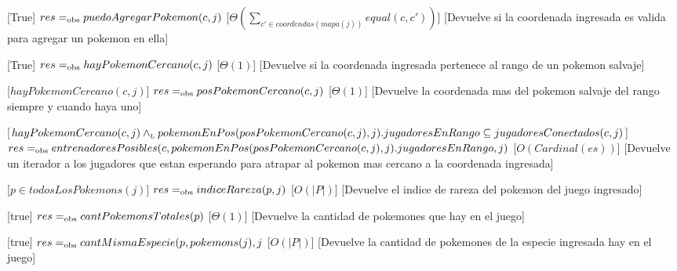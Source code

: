 \begin{Interfaz}
  [True]
  {$res =_{\mathrm{obs}} puedoAgregarPokemon(c,j)$}
  [$\Theta\left(\displaystyle\sum_{c' \in coordendas(mapa(j))}equal(c,c')\right)$]
  [Devuelve si la coordenada ingresada es valida para agregar un pokemon en ella]

  [True]
  {$res =_{\mathrm{obs}} hayPokemonCercano(c,j)$}
  [$\Theta(1)$] 
  [Devuelve si la coordenada ingresada pertenece al rango de un pokemon salvaje]   

  [$hayPokemonCercano(c,j)$]
  {$res =_{\mathrm{obs}} posPokemonCercano(c,j)$}
  [$\Theta(1)$] %
  [Devuelve la coordenada mas del pokemon salvaje del rango siempre y cuando haya uno]   

  [$hayPokemonCercano(c,j) \land_{\mathrm{\scriptscriptstyle{L}}} pokemonEnPos(posPokemonCercano(c,j),j).jugadoresEnRango \subseteq jugadoresConectados(c,j)$]
  {$res =_{\mathrm{obs}} entrenadoresPosibles(c,pokemonEnPos(posPokemonCercano(c,j),j).jugadoresEnRango,j)$}
  [$O(Cardinal(es))$] 
  [Devuelve un iterador a los jugadores que estan esperando para atrapar al pokemon mas cercano a la coordenada ingresada]   

  [$p \in todosLosPokemons(j)$]
  {$res =_{\mathrm{obs}} indiceRareza(p,j)$}
  [$O(|P|)$] 
  [Devuelve el indice de rareza del pokemon del juego ingresado]

  [true]
  {$res =_{\mathrm{obs}} cantPokemonsTotales(p)$}
  [$\Theta(1)$] 
  [Devuelve la cantidad de pokemones que hay en el juego]

  [true]
  {$res =_{\mathrm{obs}} cantMismaEspecie(p, pokemons(j), j$}
  [$O(|P|)$] 
  [Devuelve la cantidad de pokemones de la especie ingresada hay en el juego]

  
\end{Interfaz}

